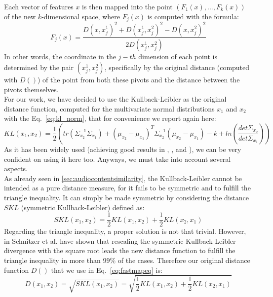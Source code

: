 Each vector of features $x$ is then mapped into the point $(F_1(x), ..., F_k(x))$ of the new $k$-dimensional space, where $F_j(x)$ is computed with the formula:
\begin{equation}
\label{eq:fastmapeq}
F_j(x) = \frac{D(x, x_j^1)^2 + D(x_j^1, x_j^2)^2 - D(x, x_j^2)^2}{2D(x_j^1, x_j^2)}
\end{equation}
In other words, the coordinate in the $j-th$ dimension of each point is determined by the pair $(x_j^1, x_j^2)$, specifically by the original distance (computed with $D()$) of the point from both these pivots and the distance between the pivots themselves. \\
For our work, we have decided to use the Kullback-Leibler as the original distance function, computed for the multivariate normal distributions $x_1$ and $x_2$ with the Eq.~\ref{eq:kl_norm}, that for convenience we report again here:
\begin{equation}
KL(x_1, x_2) = \frac{1}{2}\left(tr(\Sigma_{x_2}^{-1}\Sigma_{x_1}) + (\mu_{x_2} - \mu_{x_1})^T \Sigma_{x_2}^{-1}(\mu_{x_2} - \mu_{x_1}) - k + ln\left(\frac{det\Sigma_{x_2}}{det\Sigma_{x_1}}\right)\right)
\end{equation}
As it has been widely used (achieving good results in \cite{mirage07}, \cite{perfe11}, and \cite{fastmap12}), we can be very confident on using it here too. Anyways, we must take into account several aspects. \\ 
As already seen in \ref{sec:audiocontentsimilarity}, the Kullback-Leibler cannot be intended as a pure distance measure, for it fails to be symmetric and to fulfill the triangle inequality. It can simply be made symmetric by considering the distance $SKL$ (symmetric Kullback-Leibler) defined as:
\begin{equation}
SKL(x_1, x_2) = \frac{1}{2}KL(x_1, x_2) + \frac{1}{2}KL(x_2, x_1)
\end{equation}
Regarding the triangle inequality, a proper solution is not that trivial. However, in \cite{fastmap12} Schnitzer et al. have shown that rescaling the symmetric Kullback-Leibler divergence with the square root leads the new distance function to fulfill the triangle inequality in more than 99\% of the cases. Therefore our original distance function $D()$ that we use in Eq.~\ref{eq:fastmapeq} is:
\begin{equation}
\label{eq:distance_func}
D(x_1, x_2) = \sqrt{SKL(x_1, x_2)} = \sqrt{\frac{1}{2}KL(x_1, x_2) + \frac{1}{2}KL(x_2, x_1)}
\end{equation}


